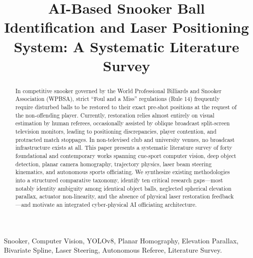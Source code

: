 \documentclass[conference]{IEEEtran}
\begin{document}
\title{AI-Based Snooker Ball Identification and Laser Positioning System: A Systematic Literature Survey}

\author{
}

\maketitle

\begin{abstract}
In competitive snooker governed by the World Professional Billiards and Snooker Association (WPBSA), strict ``Foul and a Miss'' regulations (Rule 14) frequently require disturbed balls to be restored to their exact pre-shot positions at the request of the non-offending player. Currently, restoration relies almost entirely on visual estimation by human referees, occasionally assisted by oblique broadcast split-screen television monitors, leading to positioning discrepancies, player contention, and protracted match stoppages. In non-televised club and university venues, no broadcast infrastructure exists at all. This paper presents a systematic literature survey of forty foundational and contemporary works spanning cue-sport computer vision, deep object detection, planar camera homography, trajectory physics, laser beam steering kinematics, and autonomous sports officiating. We synthesize existing methodologies into a structured comparative taxonomy, identify ten critical research gaps---most notably identity ambiguity among identical object balls, neglected spherical elevation parallax, actuator non-linearity, and the absence of physical laser restoration feedback---and motivate an integrated cyber-physical AI officiating architecture.
\end{abstract}

\begin{IEEEkeywords}
Snooker, Computer Vision, YOLOv8, Planar Homography, Elevation Parallax, Bivariate Spline, Laser Steering, Autonomous Referee, Literature Survey.
\end{IEEEkeywords}
\end{document}
